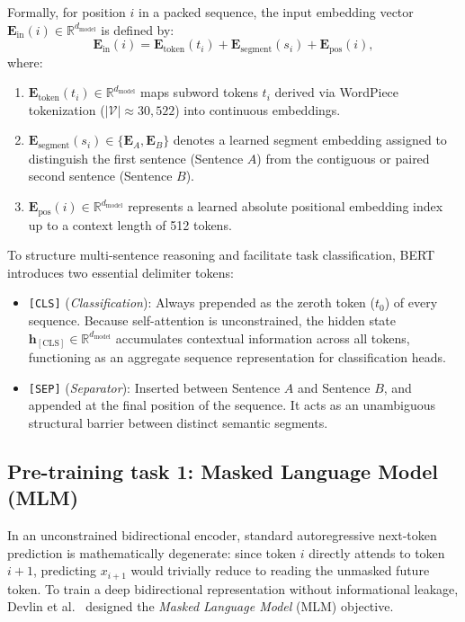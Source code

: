 \documentclass[../../../main.tex]{subfiles}
\begin{document}
Formally, for position $i$ in a packed sequence, the input embedding vector $\mathbf{E}_{\text{in}}(i) \in \mathbb{R}^{d_{\text{model}}}$ is defined by:
\begin{equation}
\mathbf{E}_{\text{in}}(i) = \mathbf{E}_{\text{token}}(t_i) + \mathbf{E}_{\text{segment}}(s_i) + \mathbf{E}_{\text{pos}}(i),
\label{eq:bert_input_embedding_sum}
\end{equation}
where:
\begin{enumerate}
    \item $\mathbf{E}_{\text{token}}(t_i) \in \mathbb{R}^{d_{\text{model}}}$ maps subword tokens $t_i$ derived via WordPiece tokenization ($|\mathcal{V}| \approx 30,522$) into continuous embeddings.
    \item $\mathbf{E}_{\text{segment}}(s_i) \in \{\mathbf{E}_A, \mathbf{E}_B\}$ denotes a learned segment embedding assigned to distinguish the first sentence (Sentence $A$) from the contiguous or paired second sentence (Sentence $B$).
    \item $\mathbf{E}_{\text{pos}}(i) \in \mathbb{R}^{d_{\text{model}}}$ represents a learned absolute positional embedding index up to a context length of 512 tokens.
\end{enumerate}

To structure multi-sentence reasoning and facilitate task classification, BERT introduces two essential delimiter tokens:
\begin{itemize}
    \item \texttt{[CLS]} (\emph{Classification}): Always prepended as the zeroth token ($t_0$) of every sequence. Because self-attention is unconstrained, the hidden state $\mathbf{h}_{[\text{CLS}]} \in \mathbb{R}^{d_{\text{model}}}$ accumulates contextual information across all tokens, functioning as an aggregate sequence representation for classification heads.
    \item \texttt{[SEP]} (\emph{Separator}): Inserted between Sentence $A$ and Sentence $B$, and appended at the final position of the sequence. It acts as an unambiguous structural barrier between distinct semantic segments.
\end{itemize}


\subsection{Pre-training task 1: Masked Language Model (MLM)}
\label{subsec:bert_masked_lm}

In an unconstrained bidirectional encoder, standard autoregressive next-token prediction is mathematically degenerate: since token $i$ directly attends to token $i+1$, predicting $x_{i+1}$ would trivially reduce to reading the unmasked future token. To train a deep bidirectional representation without informational leakage, Devlin et al.~\cite{devlin2019} designed the \emph{Masked Language Model} (MLM) objective.
\end{document}

